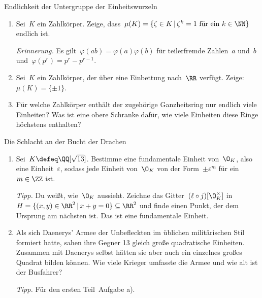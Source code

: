 \documentclass{uebblatt}
\begin{document}

\begin{aufgabe}{Endlichkeit der Untergruppe der Einheitswurzeln}
\begin{enumerate}
\item Sei~$K$ ein Zahlkörper. Zeige, dass~$\mu(K) = \{ \zeta \in K \,|\,
\text{$\zeta^k = 1$ für ein~$k \in \NN$} \}$ endlich ist.

{\tiny\emph{Erinnerung.} Es gilt~$\varphi(ab) = \varphi(a) \varphi(b)$ für
teilerfremde Zahlen~$a$ und~$b$ und~$\varphi(p^r) = p^r - p^{r-1}$.\par}

\item Sei~$K$ ein Zahlkörper, der über eine Einbettung nach~$\RR$ verfügt.
Zeige: $\mu(K) = \{ \pm1 \}$.

\item Für welche Zahlkörper enthält der zugehörige Ganzheitsring nur endlich
viele Einheiten? Was ist eine obere Schranke dafür, wie viele Einheiten diese
Ringe höchstens enthalten?
\end{enumerate}
\end{aufgabe}

\begin{aufgabe}{Die Schlacht an der Bucht der Drachen}
\begin{enumerate}
\item Sei~$K \defeq \QQ[\sqrt{13}]$. Bestimme eine fundamentale Einheit
von~$\O_K$, also eine Einheit~$\varepsilon$, sodass jede Einheit von~$\O_K$ von der
Form~$\pm \varepsilon^m$ für ein~$m \in \ZZ$ ist.

{\tiny\emph{Tipp.} Du weißt, wie~$\O_K$ aussieht. Zeichne das
Gitter~$(\ell \circ j)[\O_K^\times]$ in~$H = \{ (x,y) \in \RR^2 \,|\, x + y = 0
\} \subseteq \RR^2$ und
finde einen Punkt, der dem Ursprung am nächsten ist. Das ist eine fundamentale
Einheit.\par}

\item Als sich Daenerys' Armee der Unbefleckten im üblichen militärischen Stil
formiert hatte, sahen ihre Gegner 13 gleich große quadratische Einheiten.
Zusammen mit Daenerys selbst hätten sie aber auch ein einzelnes großes Quadrat
bilden können. Wie viele Krieger umfasste die Armee und wie alt ist der
Busfahrer?

{\tiny\emph{Tipp.} Für den ersten Teil~Aufgabe a).\par}
\end{enumerate}
\end{aufgabe}
\end{document}
